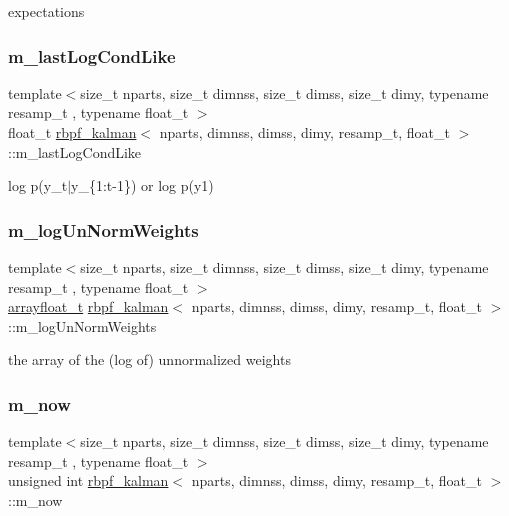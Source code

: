 expectations \mbox{\label{classrbpf__kalman_adb1cf2ea7161d4a6e5a9a7240b9cdff1}} 
\subsubsection{\texorpdfstring{m\+\_\+last\+Log\+Cond\+Like}{m\_lastLogCondLike}}
{\footnotesize\ttfamily template$<$size\+\_\+t nparts, size\+\_\+t dimnss, size\+\_\+t dimss, size\+\_\+t dimy, typename resamp\+\_\+t , typename float\+\_\+t $>$ \\
float\+\_\+t \hyperlink{classrbpf__kalman}{rbpf\+\_\+kalman}$<$ nparts, dimnss, dimss, dimy, resamp\+\_\+t, float\+\_\+t $>$\+::m\+\_\+last\+Log\+Cond\+Like\hspace{0.3cm}{\ttfamily [private]}}

log p(y\+\_\+t$\vert$y\+\_\+\{1\+:t-\/1\}) or log p(y1) \mbox{\label{classrbpf__kalman_a086f86066051a4f955b7b8b922a932af}} 
\subsubsection{\texorpdfstring{m\+\_\+log\+Un\+Norm\+Weights}{m\_logUnNormWeights}}
{\footnotesize\ttfamily template$<$size\+\_\+t nparts, size\+\_\+t dimnss, size\+\_\+t dimss, size\+\_\+t dimy, typename resamp\+\_\+t , typename float\+\_\+t $>$ \\
\hyperlink{classrbpf__kalman_a77493b35e7848d5bd91904701adabbbc}{arrayfloat\+\_\+t} \hyperlink{classrbpf__kalman}{rbpf\+\_\+kalman}$<$ nparts, dimnss, dimss, dimy, resamp\+\_\+t, float\+\_\+t $>$\+::m\+\_\+log\+Un\+Norm\+Weights\hspace{0.3cm}{\ttfamily [private]}}

the array of the (log of) unnormalized weights \mbox{\label{classrbpf__kalman_a0c27a82501d16ed1a8b427c053d47c93}} 
\subsubsection{\texorpdfstring{m\+\_\+now}{m\_now}}
{\footnotesize\ttfamily template$<$size\+\_\+t nparts, size\+\_\+t dimnss, size\+\_\+t dimss, size\+\_\+t dimy, typename resamp\+\_\+t , typename float\+\_\+t $>$ \\
unsigned int \hyperlink{classrbpf__kalman}{rbpf\+\_\+kalman}$<$ nparts, dimnss, dimss, dimy, resamp\+\_\+t, float\+\_\+t $>$\+::m\+\_\+now\hspace{0.3cm}{\ttfamily [private]}}

